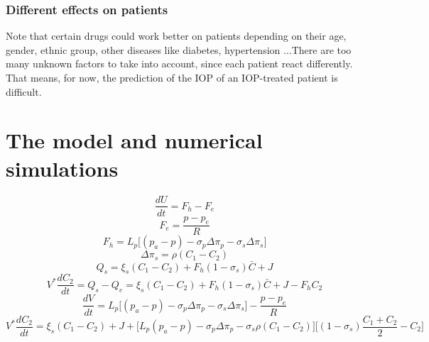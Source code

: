 \documentclass[english,12pt]{article}
\numberwithin{equation}{section}
\begin{document}
\subsubsection{Different effects on patients}
Note that certain drugs could work better on patients depending on their age, gender, ethnic group, other diseases like diabetes, hypertension ...There are too many unknown factors to take into account, since each patient react differently. That means, for now, the prediction of the IOP of an IOP-treated patient is difficult.

\section{The model and numerical simulations}\label{s3}
$$ \frac{dU}{dt}=F_{h}-F_{e}$$
$$ F_{e}= \frac{p-p_{e}}{R}$$
$$F_{h}= L_p \big[ (p_a-p)-\sigma_{p} \Delta\pi_{p}-\sigma_{s} \Delta\pi_{s}\big]$$
$$\Delta\pi_{s}= \rho(C_1-C_{2}) $$
$$ Q_s=\xi_s(C_1-C_{2})+F_h (1-\sigma_s) \bar{C}+J$$
$$ V^{\ast} \frac{dC_{2}}{dt}= Q_s-Q_e=\xi_s(C_1-C_{2})+F_h (1-\sigma_s) \bar{C}+J-F_h C_2$$
$$ \frac{dV}{dt}= L_p \big[ (p_a-p)-\sigma_{p} \Delta\pi_{p}-\sigma_{s} \Delta\pi_{s}\big]-\frac{p-p_{e}}{R}$$ 
$$  V^{\ast} \frac{dC_{2}}{dt}= \xi_s(C_1-C_{2})+J+\big[ L_p (p_a-p)-\sigma_{p} \Delta\pi_{p}-\sigma_{s} \rho (C_1-C_2)\big]
 \big[(1-\sigma_s)\frac{C_1+C_2}{2}-C_2\big]$$

\begin{thebibliography}{11}

\end{thebibliography}
\end{document}

